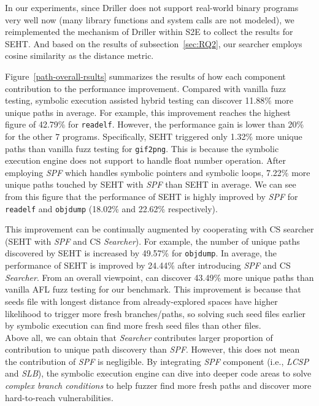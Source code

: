 In our experiments, since Driller \cite{stephens2016driller} does not support 
real-world binary programs very well now (many library functions and system 
calls are not modeled), we reimplemented the mechanism of Driller within 
S2E to collect the results for SEHT. And based on the results of 
subsection~\ref{sec:RQ2}, our searcher employs cosine similarity 
as the distance metric.

Figure~\ref{path-overall-rsults} summarizes the results of how each 
component contribution to the performance improvement. Compared with 
vanilla fuzz testing, symbolic execution assisted hybrid testing can 
discover 11.88\% more unique paths in average. For example, this 
improvement reaches the highest figure of 42.79\% for \texttt{readelf}. 
However, the performance gain is lower than 20\% for the other 7 programs. 
Specifically, SEHT triggered only 1.32\% more unique paths 
than vanilla fuzz testing for \texttt{gif2png}. This is because the 
symbolic execution engine does not support to handle float number 
operation. After employing \textit{SPF} which handles symbolic pointers 
and symbolic loops, 7.22\% more unique paths touched by SEHT with \textit{SPF}
than SEHT in average. We can see from this figure that 
the performance of SEHT is highly improved by \textit{SPF} 
for \texttt{readelf} and \texttt{objdump} (18.02\% and 22.62\% respectively).
 
This improvement can be continually augmented by cooperating with CS 
searcher (SEHT with \textit{SPF} and CS \textit{Searcher}). For example, the number 
of unique paths discovered by SEHT is increased by 
49.57\% for \texttt{objdump}. In average, the performance of SEHT 
is improved by 24.44\% after introducing \textit{SPF} and CS \textit{Searcher}. From an 
overall viewpoint, \prototype can discover 43.49\% more unique paths 
than vanilla AFL fuzz testing for our benchmark. This improvement is 
because that seeds file with longest distance from already-explored 
spaces have higher likelihood to trigger more fresh branches/paths, 
so solving such seed files earlier by symbolic execution can find more 
fresh seed files than other files. \\

 
Above all, we can obtain that \textit{Searcher} contributes larger 
proportion of contribution to unique path discovery than \textit{SPF}. 
However, this does not mean the contribution of \textit{SPF} is 
negligible. By integrating \textit{SPF} component (i.e., \textit{LCSP} 
and \textit{SLB}), the symbolic execution engine can dive into deeper 
code areas to solve \textit{complex branch conditions} to help fuzzer 
find more fresh paths and discover more hard-to-reach vulnerabilities.

